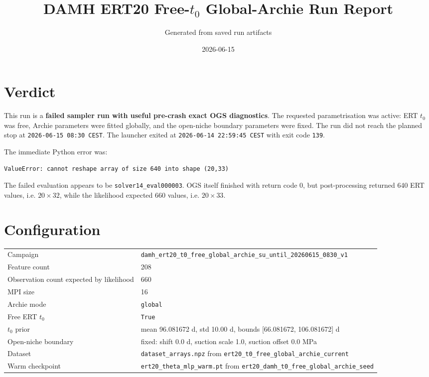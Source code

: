 \documentclass[10pt,a4paper]{article}
\title{DAMH ERT20 Free-$t_0$ Global-Archie Run Report}
\author{Generated from saved run artifacts}
\date{2026-06-15}
\begin{document}
\maketitle

\section*{Verdict}

This run is a \textbf{failed sampler run with useful pre-crash exact OGS diagnostics}.
The requested parametrisation was active: ERT $t_0$ was free, Archie parameters were fitted globally,
and the open-niche boundary parameters were fixed. The run did not reach the planned stop at
\texttt{2026-06-15 08:30 CEST}. The launcher exited at \texttt{2026-06-14 22:59:45 CEST}
with exit code \texttt{139}.

The immediate Python error was:
\begin{verbatim}
ValueError: cannot reshape array of size 640 into shape (20,33)
\end{verbatim}

The failed evaluation appears to be \texttt{solver14\_eval000003}. OGS itself finished with
return code 0, but post-processing returned 640 ERT values, i.e. $20 \times 32$, while the
likelihood expected 660 values, i.e. $20 \times 33$.

\section*{Configuration}

\begin{tabularx}{\linewidth}{@{}lX@{}}
\toprule
Campaign & \texttt{damh\_ert20\_t0\_free\_global\_archie\_su\_until\_20260615\_0830\_v1} \\
Feature count & 208 \\
Observation count expected by likelihood & 660 \\
MPI size & 16 \\
Archie mode & \texttt{global} \\
Free ERT $t_0$ & \texttt{True} \\
$t_0$ prior & mean 96.081672 d, std 10.00 d, bounds [66.081672, 106.081672] d \\
Open-niche boundary & fixed: shift 0.0 d, suction scale 1.0, suction offset 0.0 MPa \\
Dataset & \texttt{dataset\_arrays.npz} from \texttt{ert20\_t0\_free\_global\_archie\_current} \\
Warm checkpoint & \texttt{ert20\_theta\_mlp\_warm.pt} from \texttt{ert20\_damh\_t0\_free\_global\_archie\_seed} \\
\bottomrule
\end{tabularx}
\end{document}
